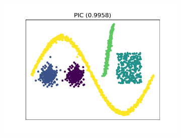 \begin{figure}[htb]
\begin{subfigure}[b]{0.32\textwidth}
        \includegraphics[width=\textwidth]{../results/plots/dataset_1/PIC_clustering.png}
    \end{subfigure}


\end{figure}
